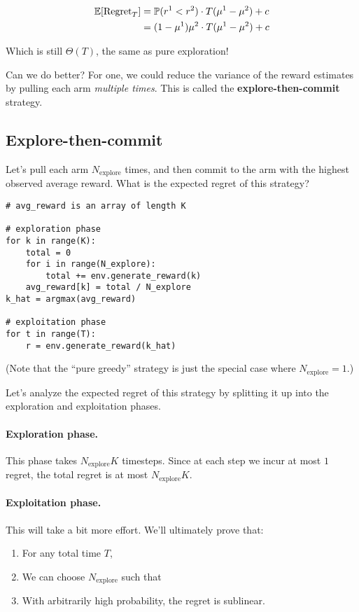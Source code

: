 \documentclass[\main/main]{subfiles}
\begin{document}
\begin{align*}
    \operatorname*{\mathbb{E}}[\text{Regret}_T] &= \operatorname{\mathbb{P}}(r^1 < r^2) \cdot T(\mu^1 - \mu^2) + c \\
    &= (1 - \mu^1) \mu^2 \cdot T(\mu^1 - \mu^2) + c
\end{align*}

Which is still $\Theta(T)$, the same as pure exploration!

Can we do better? For one, we could reduce the variance of the reward estimates by pulling each arm \emph{multiple times}. This is called the \textbf{explore-then-commit} strategy.

\subsection{Explore-then-commit}

Let's pull each arm $N_{\text{explore}}$ times, and then commit to the arm with the highest observed average reward. What is the expected regret of this strategy?

\begin{lstlisting}
# avg_reward is an array of length K

# exploration phase
for k in range(K):
    total = 0
    for i in range(N_explore):
        total += env.generate_reward(k)
    avg_reward[k] = total / N_explore
k_hat = argmax(avg_reward)

# exploitation phase
for t in range(T):
    r = env.generate_reward(k_hat)
\end{lstlisting}

(Note that the ``pure greedy'' strategy is just the special case where $N_{\text{explore}} = 1$.)

Let's analyze the expected regret of this strategy by splitting it up into the exploration and exploitation phases.

\paragraph*{Exploration phase.} This phase takes $N_{\text{explore}} K$ timesteps. Since at each step we incur at most $1$ regret, the total regret is at most $N_{\text{explore}} K$.

\paragraph*{Exploitation phase.} This will take a bit more effort. We'll ultimately prove that:

\begin{enumerate}
    \item For any total time $T$,
    \item We can choose $N_{\text{explore}}$ such that
    \item With arbitrarily high probability, the regret is sublinear.
\end{enumerate}
\end{document}
